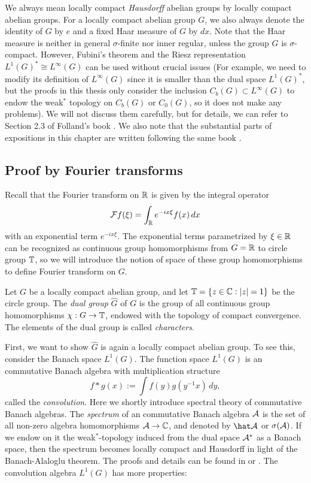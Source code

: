 \documentclass[a4paper]{article}
\begin{document}
We always mean locally compact \emph{Hausdorff} abelian groups by locally compact abelian groups.
For a locally compact abelian group $G$, we also always denote the identity of $G$ by $e$ and a fixed Haar measure of $G$ by $dx$.
Note that the Haar measure is neither in general $\sigma$-finite nor inner regular, unless the group $G$ is $\sigma$-compact.
However, Fubini's theorem and the Riesz representation $L^1(G)^*\cong L^\infty(G)$ can be used without crucial issues (For example, we need to modify its definition of $L^\infty(G)$ since it is smaller than the dual space $L^1(G)^*$, but the proofs in this thesis only consider the inclusion $C_b(G)\subset L^\infty(G)$ to endow the weak$^*$ topology on $C_b(G)$ or $C_0(G)$, so it does not make any problems).
We will not discuss them carefully, but for details, we can refer to Section 2.3 of Folland's book \cite{folland2016course}.
We also note that the substantial parts of expositions in this chapter are written following the same book \cite{folland2016course}.

\subsection{Proof by Fourier transforms}

Recall that the Fourier transform on $\mathbb{R}$ is given by the integral operator
\[\mathcal{F} f(\xi)=\int_{\mathbb{R}} e^{-ix\xi}f(x)\,dx\]
with an exponential term $e^{-ix\xi}$.
The exponential terms parametrized by $\xi\in\mathbb{R}$ can be recognized as continuous group homomorphisms from $G=\mathbb{R}$ to circle group $\mathbb{T}$, so we will introduce the notion of space of these group homomorphisms to define Fourier transform on $G$.

\begin{defn}
Let $G$ be a locally compact abelian group, and let $\mathbb{T}=\{z\in\mathbb{C}:|z|=1\}$ be the circle group.
The \emph{dual group} $\hat G$ of $G$ is the group of all continuous group homomorphisms $\chi:G\to\mathbb{T}$, endowed with the topology of compact convergence.
The elements of the dual group is called \emph{characters}.
\end{defn}

First, we want to show $\hat G$ is again a locally compact abelian group.
To see this, consider the Banach space $L^1(G)$.
The function space $L^1(G)$ is an commutative Banach algebra with multiplication structure
\[f*g(x):=\int f(y)g(y^{-1}x)\,dy,\]
called the \emph{convolution}.
Here we shortly introduce spectral theory of commutative Banach algebras.
The \emph{spectrum} of an commutative Banach algebra $\mathcal{A}$ is the set of all non-zero algebra homomorphisms $\mathcal{A}\to\mathbb{C}$, and denoted by $\hat\cA$ or $\sigma(\mathcal{A})$.
If we endow on it the weak$^*$-topology induced from the dual space $\mathcal{A}^*$ as a Banach space, then the spectrum becomes locally compact and Hausdorff in light of the Banach-Alaloglu theorem.
The proofs and details can be found in \cite{murphy2014c} or \cite{conway2019course}.
The convolution algebra $L^1(G)$ has more properties:
\end{document}
